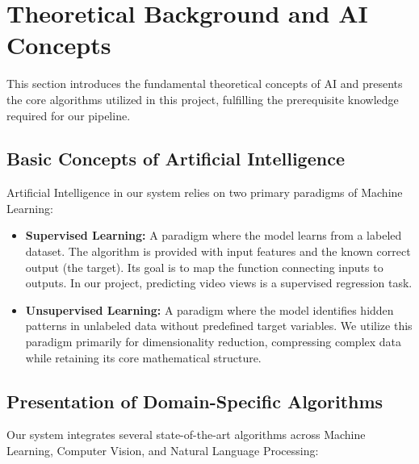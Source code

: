 \section{Theoretical Background and AI Concepts}
This section introduces the fundamental theoretical concepts of AI and presents the core algorithms utilized in this project, fulfilling the prerequisite knowledge required for our pipeline.

\subsection{Basic Concepts of Artificial Intelligence}
Artificial Intelligence in our system relies on two primary paradigms of Machine Learning:
\begin{itemize}
    \item \textbf{Supervised Learning:} A paradigm where the model learns from a labeled dataset. The algorithm is provided with input features and the known correct output (the target). Its goal is to map the function connecting inputs to outputs. In our project, predicting video views is a supervised regression task.
    \item \textbf{Unsupervised Learning:} A paradigm where the model identifies hidden patterns in unlabeled data without predefined target variables. We utilize this paradigm primarily for dimensionality reduction, compressing complex data while retaining its core mathematical structure.
\end{itemize}

\subsection{Presentation of Domain-Specific Algorithms}
Our system integrates several state-of-the-art algorithms across Machine Learning, Computer Vision, and Natural Language Processing:

